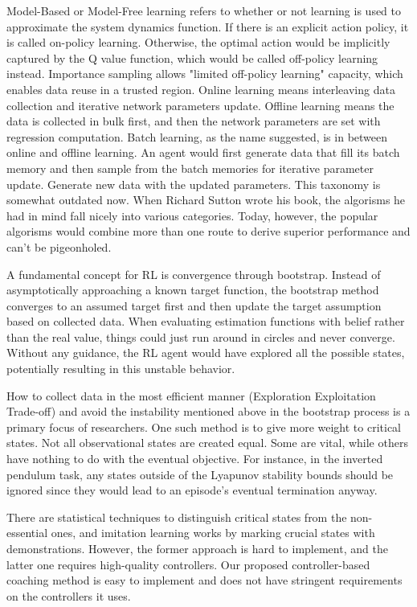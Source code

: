 \documentclass[journal]{IEEEtran}
\begin{document}
Model-Based or Model-Free learning refers to whether or not learning is used to approximate the system dynamics function. If there is an explicit action policy, it is called on-policy learning. Otherwise, the optimal action would be implicitly captured by the Q value function, which would be called off-policy learning instead. Importance sampling allows "limited off-policy learning" capacity, which enables data reuse in a trusted region. Online learning means interleaving data collection and iterative network parameters update. Offline learning means the data is collected in bulk first, and then the network parameters are set with regression computation. Batch learning, as the name suggested, is in between online and offline learning. An agent would first generate data that fill its batch memory and then sample from the batch memories for iterative parameter update. Generate new data with the updated parameters. This taxonomy is somewhat outdated now. When Richard Sutton wrote his book\cite{Sutton1998IntroductionTR}, the algorisms he had in mind fall nicely into various categories. Today, however, the popular algorisms would combine more than one route to derive superior performance and can't be pigeonholed.

A fundamental concept for RL is convergence through bootstrap. Instead of asymptotically approaching a known target function, the bootstrap method converges to an assumed target first and then update the target assumption based on collected data. When evaluating estimation functions with belief rather than the real value, things could just run around in circles and never converge. Without any guidance, the RL agent would have explored all the possible states, potentially resulting in this unstable behavior. 

How to collect data in the most efficient manner (Exploration Exploitation Trade-off) and avoid the instability mentioned above in the bootstrap process is a primary focus of researchers. One such method is to give more weight to critical states. Not all observational states are created equal. Some are vital, while others have nothing to do with the eventual objective. For instance, in the inverted pendulum task, any states outside of the Lyapunov stability bounds should be ignored since they would lead to an episode's eventual termination anyway.  

There are statistical techniques to distinguish critical states from the non-essential ones, and imitation learning works by marking crucial states with demonstrations. However, the former approach is hard to implement, and the latter one requires high-quality controllers. Our proposed controller-based coaching method is easy to implement and does not have stringent requirements on the controllers it uses.
\end{document}
